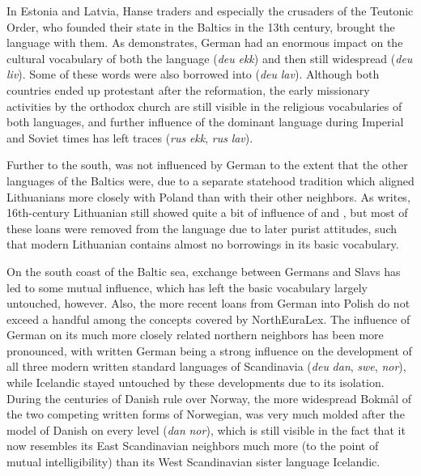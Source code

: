 In Estonia and Latvia, Hanse traders and especially the crusaders of the Teutonic Order, who founded their state in the Baltics in the 13th century, brought the  language with them. As \cite{rot1988} demonstrates, German had an enormous impact on the cultural vocabulary of both the  language (\textit{deu} \arrowLA \textit{ekk}) and then still widespread  (\textit{deu} \arrowLA \textit{liv}). Some of these words were also borrowed into  (\textit{deu} \arrowOA \textit{lav}). Although both countries ended up protestant after the reformation, the early missionary activities by the orthodox church are still visible in the religious vocabularies of both languages, and further influence of the dominant language during Imperial  and Soviet times has left traces (\textit{rus} \arrowLA \textit{ekk}, \textit{rus} \arrowOA \textit{lav}).

Further to the south,  was not influenced by German to the extent that the other languages of the Baltics were, due to a separate statehood tradition which aligned Lithuanians more closely with Poland than with their other neighbors. As \cite{senn1944} writes, 16th-century Lithuanian still showed quite a bit of influence of  and , but most of these loans were removed from the language due to later purist attitudes, such that modern Lithuanian contains almost no borrowings in its basic vocabulary.

On the south coast of the Baltic sea, exchange between Germans and Slavs has led to some mutual influence, which has left the basic vocabulary largely untouched, however. Also, the more recent loans from German into Polish do not exceed a handful among the concepts covered by NorthEuraLex. The influence of German on its much more closely related northern neighbors has been more pronounced, with written German being a strong influence on the development of all three modern written standard languages of Scandinavia (\textit{deu} \arrowOA \textit{dan}, \textit{swe}, \textit{nor}), while Icelandic stayed untouched by these developments due to its isolation. During the centuries of Danish rule over Norway, the more widespread Bokm\aa{}l of the two competing written forms of Norwegian, was very much molded after the model of Danish on every level (\textit{dan} \arrowOA \textit{nor}), which is still visible in the fact that it now resembles its East Scandinavian neighbors much more (to the point of mutual intelligibility) than its West Scandinavian sister language Icelandic.

